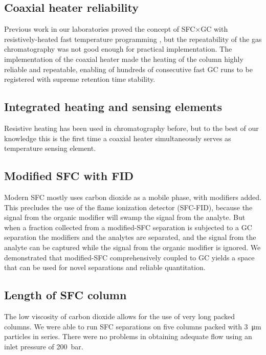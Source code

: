 \subsection{Coaxial heater reliability}

Previous work in our laboratories proved the concept of SFC×GC with
resistively-heated fast temperature programming \autocite{Venter2004,
Venter2006}, but the repeatability of the gas chromatography was not good enough
for practical implementation. The implementation of the coaxial heater made the
heating of the column highly reliable and repeatable, enabling of hundreds of
consecutive fast GC runs to be registered with supreme retention time stability.

\subsection{Integrated heating and sensing elements}

Resistive heating has been used in chromatography before, but to the best of our
knowledge this is the first time a coaxial heater simultaneously serves as
temperature sensing element.

\subsection{Modified SFC with FID}

Modern SFC mostly uses carbon dioxide as a mobile phase, with modifiers added.
This precludes the use of the flame ionization detector (SFC-FID), because the
signal from the organic modifier will swamp the signal from the analyte. But when a
fraction collected from a modified-SFC separation is subjected to a GC
separation the modifiers and the analytes are separated, and the signal
from the analyte can be captured while the signal from the organic modifier is ignored.
We demonstrated that modified-SFC comprehensively coupled to GC yields a space
that can be used for novel separations and reliable quantitation.

\subsection{Length of SFC column}

The low viscosity of carbon dioxide allows for the use of very long packed
columns. We were able to run SFC separations on five columns packed with
\SI{3}{\micro\metre} particles in series. There were no problems in obtaining
adequate flow using an inlet pressure of \SI{200}{\bar}.

